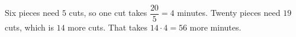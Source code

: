 Six pieces need $5$ cuts, so one cut takes $\dfrac{20}{5}=4$ minutes. Twenty pieces need $19$ cuts, which is $14$ more cuts. That takes $14\cdot4=\boxed{56}$ more minutes.
